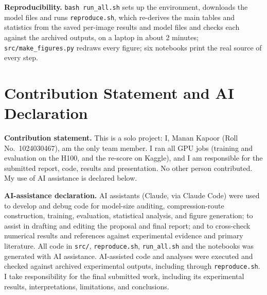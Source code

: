 \documentclass[10pt,twocolumn,letterpaper]{article}
\begin{document}
\textbf{Reproducibility.} \texttt{bash run\_all.sh} sets up the environment, downloads the model files and runs \texttt{reproduce.sh}, which re-derives the main tables and statistics from the saved per-image results and model files and checks each against the archived outputs, on a laptop in about 2 minutes; \texttt{src/make\_figures.py} redraws every figure; six notebooks print the real source of every step.

{\small


}

\section*{Contribution Statement and AI Declaration}
\textbf{Contribution statement.} This is a solo project: I, Manan Kapoor (Roll No.\ 1024030467), am the only team member. I ran all GPU jobs (training and evaluation on the H100, and the re-score on Kaggle), and I am responsible for the submitted report, code, results and presentation. No other person contributed. My use of AI assistance is declared below.

\textbf{AI-assistance declaration.} AI assistants (Claude, via Claude Code) were used to develop and debug code for model-size auditing, compression-route construction, training, evaluation, statistical analysis, and figure generation; to assist in drafting and editing the proposal and final report; and to cross-check numerical results and references against experimental evidence and primary literature. All code in \texttt{src/}, \texttt{reproduce.sh}, \texttt{run\_all.sh} and the notebooks was generated with AI assistance. AI-assisted code and analyses were executed and checked against archived experimental outputs, including through \texttt{reproduce.sh}. I take responsibility for the final submitted work, including its experimental results, interpretations, limitations, and conclusions.
\end{document}
